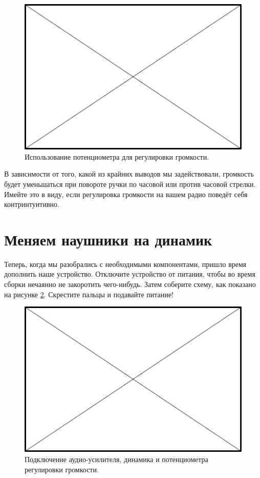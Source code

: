 \begin{figure}
  \centering
  \includegraphics{TODO}
  \caption{Использование потенциометра для регулировки громкости.}
  \label{fig:pot-volume}
\end{figure}

В зависимости от того, какой из крайних выводов мы задействовали, громкость будет уменьшаться при повороте ручки по часовой или против часовой стрелки. Имейте это в виду, если регулировка громкости на вашем радио поведёт себя контринтуитивно.

\section{Меняем наушники на динамик}

Теперь, когда мы разобрались с необходимыми компонентами, пришло время дополнить наше устройство. Отключите устройство от питания, чтобы во время сборки нечаянно не закоротить чего-нибудь. Затем соберите схему, как показано на рисунке \ref{fig:amp-pot-speaker-wiring}. Скрестите пальцы и подавайте питание!

\begin{figure}
  \centering
  \includegraphics{TODO}
  \caption{Подключение аудио-усилителя, динамика и потенциометра регулировки громкости.}
  \label{fig:amp-pot-speaker-wiring}
\end{figure}


